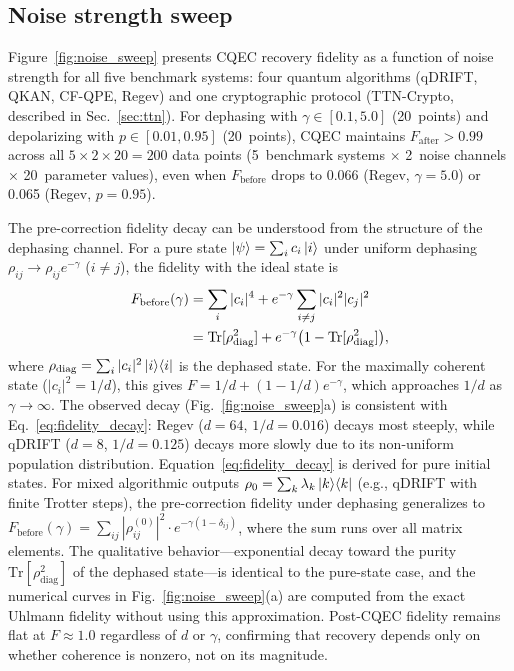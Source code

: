 \documentclass[prx,twocolumn,superscriptaddress,longbibliography,floatfix]{revtex4-2}
\begin{document}
\subsection{Noise strength sweep}
\label{sec:noise_sweep}

Figure~\ref{fig:noise_sweep} presents CQEC recovery fidelity as a function of noise strength for all five benchmark systems: four quantum algorithms (qDRIFT, QKAN, CF-QPE, Regev) and one cryptographic protocol (TTN-Crypto, described in Sec.~\ref{sec:ttn}).
For dephasing with $\gamma \in [0.1, 5.0]$ (20~points) and depolarizing with $p \in [0.01, 0.95]$ (20~points), CQEC maintains $F_\mathrm{after} > 0.99$ across all $5 \times 2 \times 20 = 200$ data points (5~benchmark systems $\times$ 2~noise channels $\times$ 20~parameter values), even when $F_\mathrm{before}$ drops to 0.066 (Regev, $\gamma = 5.0$) or 0.065 (Regev, $p = 0.95$).

The pre-correction fidelity decay can be understood from the structure of the dephasing channel.
For a pure state $\ket{\psi} = \sum_i c_i \ket{i}$ under uniform dephasing $\rho_{ij} \to \rho_{ij} e^{-\gamma}$ ($i \neq j$), the fidelity with the ideal state is
\begin{align}
F_\mathrm{before}(\gamma) &= \sum_i |c_i|^4 + e^{-\gamma} \sum_{i \neq j} |c_i|^2 |c_j|^2 \notag \\
&= \mathrm{Tr}[\rho_\mathrm{diag}^2] + e^{-\gamma}\bigl(1 - \mathrm{Tr}[\rho_\mathrm{diag}^2]\bigr),
\label{eq:fidelity_decay}
\end{align}
where $\rho_\mathrm{diag} = \sum_i |c_i|^2 \ket{i}\!\bra{i}$ is the dephased state.
For the maximally coherent state ($|c_i|^2 = 1/d$), this gives $F = 1/d + (1 - 1/d)e^{-\gamma}$, which approaches $1/d$ as $\gamma \to \infty$.
The observed decay (Fig.~\ref{fig:noise_sweep}a) is consistent with Eq.~\eqref{eq:fidelity_decay}: Regev ($d = 64$, $1/d = 0.016$) decays most steeply, while qDRIFT ($d = 8$, $1/d = 0.125$) decays more slowly due to its non-uniform population distribution.
Equation~\eqref{eq:fidelity_decay} is derived for pure initial states.
For mixed algorithmic outputs $\rho_0 = \sum_k \lambda_k \ket{k}\!\bra{k}$ (e.g., qDRIFT with finite Trotter steps), the pre-correction fidelity under dephasing generalizes to
$F_\mathrm{before}(\gamma) = \sum_{ij} |\rho_{ij}^{(0)}|^2 \cdot e^{-\gamma(1-\delta_{ij})}$,
where the sum runs over all matrix elements.
The qualitative behavior---exponential decay toward the purity $\mathrm{Tr}[\rho_\mathrm{diag}^2]$ of the dephased state---is identical to the pure-state case, and the numerical curves in Fig.~\ref{fig:noise_sweep}(a) are computed from the exact Uhlmann fidelity without using this approximation.
Post-CQEC fidelity remains flat at $F \approx 1.0$ regardless of $d$ or $\gamma$, confirming that recovery depends only on whether coherence is nonzero, not on its magnitude.
\end{document}
